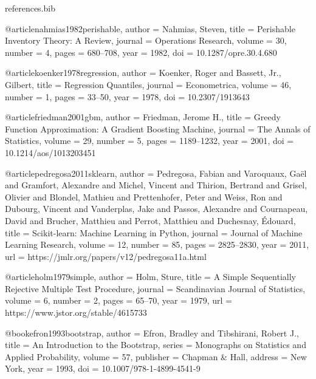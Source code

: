 \begin{filecontents*}{references.bib}

@article{nahmias1982perishable,
  author  = {Nahmias, Steven},
  title   = {Perishable Inventory Theory: A Review},
  journal = {Operations Research},
  volume  = {30},
  number  = {4},
  pages   = {680--708},
  year    = {1982},
  doi     = {10.1287/opre.30.4.680}
}

@article{koenker1978regression,
  author  = {Koenker, Roger and Bassett, Jr., Gilbert},
  title   = {Regression Quantiles},
  journal = {Econometrica},
  volume  = {46},
  number  = {1},
  pages   = {33--50},
  year    = {1978},
  doi     = {10.2307/1913643}
}

@article{friedman2001gbm,
  author  = {Friedman, Jerome H.},
  title   = {Greedy Function Approximation: A Gradient Boosting Machine},
  journal = {The Annals of Statistics},
  volume  = {29},
  number  = {5},
  pages   = {1189--1232},
  year    = {2001},
  doi     = {10.1214/aos/1013203451}
}

@article{pedregosa2011sklearn,
  author  = {Pedregosa, Fabian and Varoquaux, Ga{\"e}l and Gramfort, Alexandre and Michel, Vincent and Thirion, Bertrand and Grisel, Olivier and Blondel, Mathieu and Prettenhofer, Peter and Weiss, Ron and Dubourg, Vincent and Vanderplas, Jake and Passos, Alexandre and Cournapeau, David and Brucher, Matthieu and Perrot, Matthieu and Duchesnay, {\'E}douard},
  title   = {Scikit-learn: Machine Learning in {P}ython},
  journal = {Journal of Machine Learning Research},
  volume  = {12},
  number  = {85},
  pages   = {2825--2830},
  year    = {2011},
  url     = {https://jmlr.org/papers/v12/pedregosa11a.html}
}

@article{holm1979simple,
  author  = {Holm, Sture},
  title   = {A Simple Sequentially Rejective Multiple Test Procedure},
  journal = {Scandinavian Journal of Statistics},
  volume  = {6},
  number  = {2},
  pages   = {65--70},
  year    = {1979},
  url     = {https://www.jstor.org/stable/4615733}
}

@book{efron1993bootstrap,
  author    = {Efron, Bradley and Tibshirani, Robert J.},
  title     = {An Introduction to the Bootstrap},
  series    = {Monographs on Statistics and Applied Probability},
  volume    = {57},
  publisher = {Chapman \& Hall},
  address   = {New York},
  year      = {1993},
  doi       = {10.1007/978-1-4899-4541-9}
}


\end{filecontents*}
